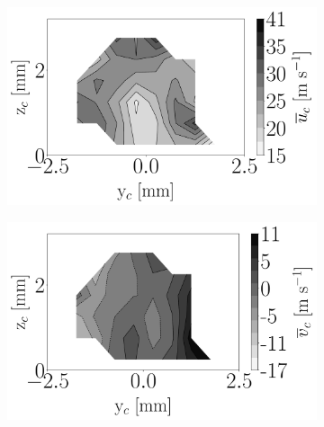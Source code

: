 \begin{figure}[h!]
\begin{subfigure}[b]{0.3\textwidth}
	\centering
   \includegraphics[scale=\scaleSLIBIMER]{./part3_applications/figures_ch8_resolved/injectors_SLI/dx15_xD06p67_ux_mean_map}
\end{subfigure}
   \hspace{0.17in}
\begin{subfigure}[b]{0.3\textwidth}
	\centering
   \includegraphics[scale=\scaleSLIBIMER]{./part3_applications/figures_ch8_resolved/injectors_SLI/dx15_xD06p67_uy_mean_map}
\end{subfigure}
   \hspace{0.17in}
\begin{subfigure}[b]{0.3\textwidth}
	\centering

\end{subfigure}
\end{figure}
